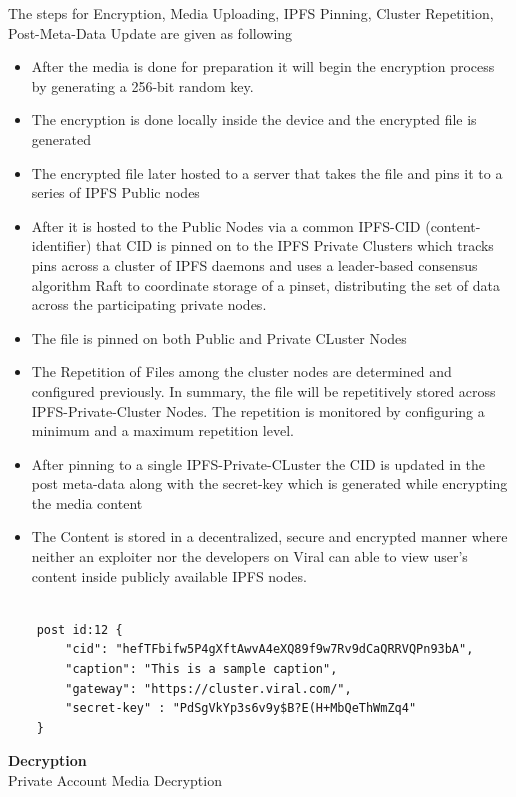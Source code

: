 \documentclass[10pt]{article}
\begin{document}
The steps for Encryption, Media Uploading, IPFS Pinning, Cluster Repetition, Post-Meta-Data Update are given as following
\begin{itemize}[leftmargin=+0.2in]
\item After the media is done for preparation it will begin the encryption process by generating a 256-bit random key.
\item The encryption is done locally inside the device and the encrypted file is generated
\item The encrypted file later hosted to a server that takes the file and pins it to a series of IPFS Public nodes
\item After it is hosted to the Public Nodes via a common IPFS-CID (content-identifier) that CID is pinned on to the IPFS Private Clusters which tracks pins across a cluster of IPFS daemons and uses a leader-based consensus algorithm Raft to coordinate storage of a pinset, distributing the set of data across the participating private nodes.
\item The file is pinned on both Public and Private CLuster Nodes
\item The Repetition of Files among the cluster nodes are determined and configured previously. In summary, the file will be repetitively stored across IPFS-Private-Cluster Nodes. The repetition is monitored by configuring a minimum and a maximum repetition level.
\item After pinning to a single IPFS-Private-CLuster the CID is updated in the post meta-data along with the secret-key which is generated while encrypting the media content
\item The Content is stored in a decentralized, secure and encrypted manner where neither an exploiter nor the developers on Viral can able to view user's content inside publicly available IPFS nodes.
\end{itemize}

\begin{lstlisting}[caption={Post Meta-Data}, numbers=none]

	post id:12 {
    	"cid": "hefTFbifw5P4gXftAwvA4eXQ89f9w7Rv9dCaQRRVQPn93bA",
   		"caption": "This is a sample caption",
    	"gateway": "https://cluster.viral.com/",
    	"secret-key" : "PdSgVkYp3s6v9y$B?E(H+MbQeThWmZq4"
	}
\end{lstlisting}




\textbf{Decryption}\\

Private Account Media Decryption\\
\end{document}
